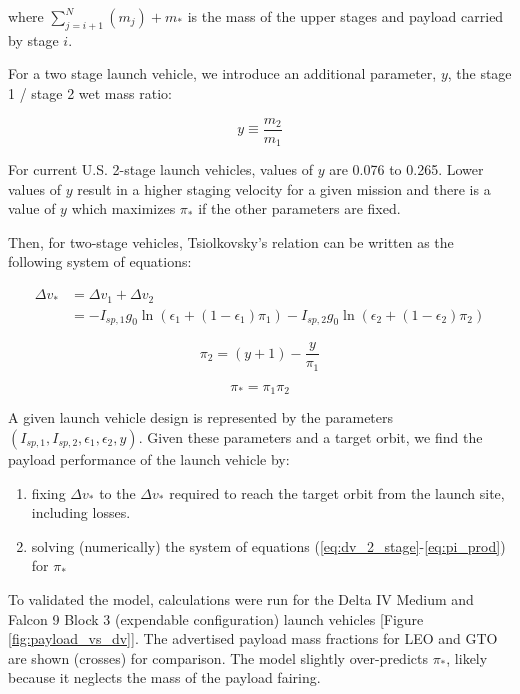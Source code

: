 \documentclass[conf]{new-aiaa}
\begin{document}
where $\sum_{j=i+1}^N (m_j) + m_*$ is the mass of the upper stages and payload carried by stage $i$.

For a two stage launch vehicle, we introduce an additional parameter, $y$, the stage 1 / stage 2 wet mass ratio:

\begin{equation}
y \equiv \frac{m_2}{m_1}
\end{equation}

For current U.S. 2-stage launch vehicles, values of $y$ are 0.076 to 0.265. Lower values of $y$ result in a higher staging velocity for a given mission and there is a value of $y$ which maximizes $\pi_*$ if the other parameters are fixed.

Then, for two-stage vehicles, Tsiolkovsky’s relation can be written as the following system of equations:

\begin{equation}
\begin{aligned}
\label{eq:dv_2_stage}
\Delta v_* &= \Delta v_1 + \Delta v_2 \\
           &= - I_{sp,1} g_0 \ln \left( \epsilon_1 + (1 - \epsilon_1) \pi_1 \right)
             - I_{sp,2} g_0 \ln \left( \epsilon_2 + (1 - \epsilon_2) \pi_2 \right)
\end{aligned}
\end{equation}

\begin{equation}
\label{eq:ypi}
\pi_2 = (y + 1) - \frac{y}{\pi_1}
\end{equation}

\begin{equation}
\label{eq:pi_prod}
\pi_* = \pi_1 \pi_2
\end{equation}

A given launch vehicle design is represented by the parameters $(I_{sp,1}, I_{sp,2}, \epsilon_1, \epsilon_2, y)$. Given these parameters and a target orbit, we find the payload performance of the launch vehicle by:

\begin{enumerate}
    \item fixing $\Delta v_*$ to the $\Delta v_*$ required to reach the target orbit from the launch site, including losses.
    \item solving (numerically) the system of equations (\ref{eq:dv_2_stage}-\ref{eq:pi_prod}) for $\pi_*$
\end{enumerate}

To validated the model, calculations were run for the Delta IV Medium and Falcon 9 Block 3 (expendable configuration) launch vehicles [Figure \ref{fig:payload_vs_dv}]. The advertised payload mass fractions for LEO and GTO are shown (crosses) for comparison. The model slightly over-predicts $\pi_*$, likely because it neglects the mass of the payload fairing.
\end{document}
